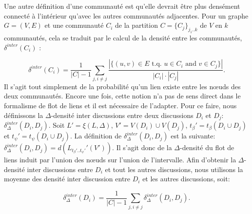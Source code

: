 Une autre définition d'une communauté est qu'elle devrait être plus densément connecté à l'intérieur qu'avec les autres communautés adjacentes.
Pour un graphe $G=(V,E)$ et une communauté $C_i$ de la partition $C = \{C_j\}_{j_1..k}$ de $V$ en $k$ communautés, cela se traduit par le calcul de la densité entre les communautés, $\delta^{inter}(C_i)$ :

\begin{equation}
	\delta^{inter}(C_i) = \frac{1}{|C|-1}\sum_{j, i\ne j}\frac{|\{(u,v)\in E\mbox{ t.q. }u\in C_i\mbox{ and }v\in C_j\}|}{|C_i|\cdot |C_j|}.
\end{equation}
Il s'agit tout simplement de la probabilité qu'un lien existe entre les n\oe uds des deux communautés.
Encore une fois, cette notion n'a pas de sens direct dans le formalisme de flot de liens et il est nécessaire de l'adapter.
Pour ce faire, nous définissons la $\Delta$-densité inter discussions entre deux discussions $D_i$ et $D_j$: $\delta^{inter}_{\Delta}(D_i,D_j)$.
Soit $L'= \xi(L,\Delta)$, $V'= V(D_i) \cup V(D_j)$, $t_{\beta}'=t_{\beta}(D_i \cup D_j)$ et $t_{\psi}'=t_{\psi}(D_i \cup D_j)$.
La définition de $\delta^{inter}_{\Delta}(D_i,D_j)$ est la suivante: $\delta^{inter}_{\Delta}(D_i,D_j) = d(L_{t_{\beta}'..t_{\psi}'}'(V'))$.
Il s'agit donc de la $\Delta$-densité du flot de liens induit par l'union des n\oe uds sur l'union de l'intervalle.
Afin d'obtenir la $\Delta$-densité inter discussions entre $D_i$ et tout les autres discussions, nous utilisons la moyenne des densité inter discussion entre $D_i$ et les autres discussions, soit:

\begin{equation}
	\delta^{inter}_{\Delta}(D_i) = \frac{1}{|C|-1}\sum_{j,i\ne j} \delta^{inter}_{\Delta}(D_i,D_j).
\end{equation}

